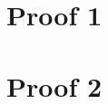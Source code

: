 \documentclass[12pt, twoside, openright]{report}
\begin{document}
\appendix

\chapter{Proof 1}

\blindmathtrue
\Blindtext

\chapter{Proof 2}

\blindtext
\end{document}

